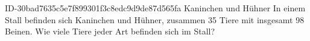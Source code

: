 \begin{exercise}
      {ID-30bad7635c5e7f899301f3c8edc9d9de87d565fa}
      {Kaninchen und Hühner}
  \ifproblem\problem
    In einem Stall befinden sich Kaninchen und Hühner, zusammen 35 Tiere mit
    insgesamt 98 Beinen. Wie viele Tiere jeder Art befinden sich im Stall?
  \fi
\end{exercise}
